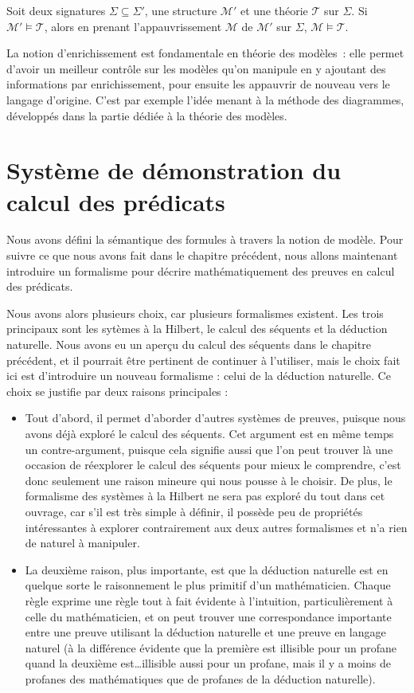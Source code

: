\begin{corollary}
  Soit deux signatures $\Sigma\subseteq\Sigma'$, une structure $\mathcal M'$
  et une théorie $\mathcal T$ sur $\Sigma$. Si $\mathcal M'\models \mathcal T$,
  alors en prenant l'appauvrissement $\mathcal M$ de $\mathcal M'$ sur $\Sigma$,
  $\mathcal M\models \mathcal T$.
\end{corollary}

La notion d'enrichissement est fondamentale en théorie des modèles~: elle
permet d'avoir un meilleur contrôle sur les modèles qu'on manipule en y ajoutant
des informations par enrichissement, pour ensuite les appauvrir de nouveau vers
le langage d'origine. C'est par exemple l'idée menant à la méthode des
diagrammes, développés dans la partie dédiée à la théorie des modèles.

\section[Syntaxe de preuves]{Système de démonstration du calcul des prédicats}

Nous avons défini la sémantique des formules à travers la notion de modèle. Pour
suivre ce que nous avons fait dans le chapitre précédent, nous allons maintenant
introduire un formalisme pour décrire mathématiquement des preuves en calcul des
prédicats.

Nous avons alors plusieurs choix, car plusieurs formalismes existent. Les trois
principaux sont les sytèmes à la Hilbert, le calcul des séquents et la déduction
naturelle. Nous avons eu un aperçu du calcul des séquents dans le chapitre
précédent, et il pourrait être pertinent de continuer à l'utiliser, mais le
choix fait ici est d'introduire un nouveau formalisme : celui de la déduction
naturelle. Ce choix se justifie par deux raisons principales :
\begin{itemize}
\item Tout d'abord, il permet d'aborder d'autres systèmes de preuves, puisque
  nous avons déjà exploré le calcul des séquents. Cet argument est en même temps
  un contre-argument, puisque cela signifie aussi que l'on peut trouver là une
  occasion de réexplorer le calcul des séquents pour mieux le comprendre, c'est
  donc seulement une raison mineure qui nous pousse à le choisir. De plus, le
  formalisme des systèmes à la Hilbert ne sera pas exploré du tout dans cet
  ouvrage, car s'il est très simple à définir, il possède peu de propriétés
  intéressantes à explorer contrairement aux deux autres formalismes et n'a rien
  de naturel à manipuler.
\item La deuxième raison, plus importante, est que la déduction naturelle est en
  quelque sorte le raisonnement le plus primitif d'un mathématicien. Chaque
  règle exprime une règle tout à fait évidente à l'intuition, particulièrement à
  celle du mathématicien, et on peut trouver une correspondance importante
  entre une preuve utilisant la déduction naturelle et une preuve en langage
  naturel (à la différence évidente que la première est illisible pour un
  profane quand la deuxième est\ldots illisible aussi pour un profane, mais il y
  a moins de profanes des mathématiques que de profanes de la déduction
  naturelle).
\end{itemize}

